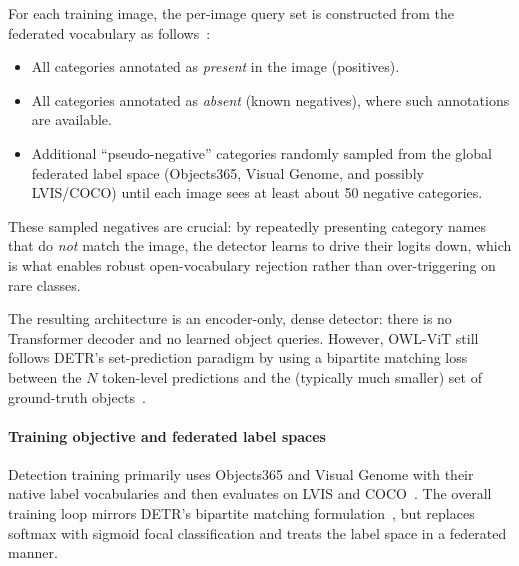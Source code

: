 \begin{enrichment}
\begin{enrichment}[Method][subsection]
\begin{itemize}
			\newpage
			
			For each training image, the per-image query set is constructed from the federated vocabulary as follows~\cite{minderer2022_owlvit}:
			\begin{itemize}
				\item All categories annotated as \emph{present} in the image (positives).
				\item All categories annotated as \emph{absent} (known negatives), where such annotations are available.
				\item Additional ``pseudo-negative'' categories randomly sampled from the global federated label space (Objects365, Visual Genome, and possibly LVIS/COCO) until each image sees at least about 50 negative categories.
			\end{itemize}
			These sampled negatives are crucial: by repeatedly presenting category names that do \emph{not} match the image, the detector learns to drive their logits down, which is what enables robust open-vocabulary rejection rather than over-triggering on rare classes.
			
		\end{itemize}
		
		The resulting architecture is an encoder-only, dense detector: there is no Transformer decoder and no learned object queries.
		However, OWL-ViT still follows DETR’s set-prediction paradigm by using a bipartite matching loss between the $N$ token-level predictions and the (typically much smaller) set of ground-truth objects~\cite{carion2020_detr}.
		
		\paragraph{Training objective and federated label spaces}
		Detection training primarily uses Objects365 and Visual Genome with their native label vocabularies and then evaluates on LVIS and COCO~\cite{minderer2022_owlvit}.
		The overall training loop mirrors DETR’s bipartite matching formulation~\cite{carion2020_detr}, but replaces softmax with sigmoid focal classification and treats the label space in a federated manner.
		

\end{enrichment}
\end{enrichment}
